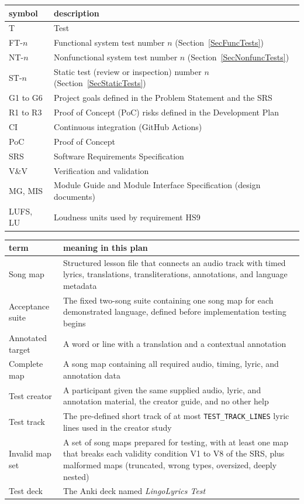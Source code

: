\documentclass[12pt, titlepage]{article}
\newcommand{\cn}[1]{\texttt{#1}}
\begin{document}
\renewcommand{\arraystretch}{1.2}
\begin{tabularx}{\textwidth}{l X} 
  \toprule		
  \textbf{symbol} & \textbf{description}\\
  \midrule 
  T & Test\\
  FT-$n$ & Functional system test number $n$ (Section~\ref{SecFuncTests})\\
  NT-$n$ & Nonfunctional system test number $n$
  (Section~\ref{SecNonfuncTests})\\
  ST-$n$ & Static test (review or inspection) number $n$
  (Section~\ref{SecStaticTests})\\
  G1 to G6 & Project goals defined in the Problem Statement and the SRS\\
  R1 to R3 & Proof of Concept (PoC) risks defined in the Development Plan\\
  CI & Continuous integration (GitHub Actions)\\
  PoC & Proof of Concept\\
  SRS & Software Requirements Specification\\
  V\&V & Verification and validation\\
  MG, MIS & Module Guide and Module Interface Specification (design documents)\\
  LUFS, LU & Loudness units used by requirement HS9\\
  \bottomrule
\end{tabularx}

\vspace{1em}

\begin{tabularx}{\textwidth}{l X} 
  \toprule		
  \textbf{term} & \textbf{meaning in this plan}\\
  \midrule 
  Song map & Structured lesson file that connects an audio track with timed
  lyrics, translations, transliterations, annotations, and language metadata\\
  Acceptance suite & The fixed two-song suite containing one song map for each
  demonstrated language, defined before implementation testing begins\\
  Annotated target & A word or line with a translation and a contextual
  annotation\\
  Complete map & A song map containing all required audio, timing, lyric, and
  annotation data\\
  Test creator & A participant given the same supplied audio, lyric, and
  annotation material, the creator guide, and no other help\\
  Test track & The pre-defined short track of at most \cn{TEST\_TRACK\_LINES}
  lyric lines used in the creator study\\
  Invalid map set & A set of song maps prepared for testing, with at least one
  map that breaks each validity condition V1 to V8 of the SRS, plus malformed
  maps (truncated, wrong types, oversized, deeply nested)\\
  Test deck & The Anki deck named \emph{LingoLyrics Test}\\
  \bottomrule
\end{tabularx}
\end{document}
